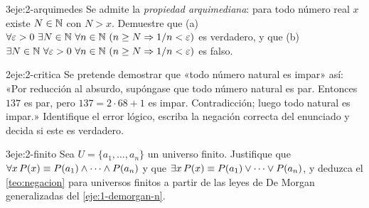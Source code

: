 \begin{ejercicio}{3}{eje:2-arquimedes}
Se admite la \emph{propiedad arquimediana}: para todo número real $x$ existe $N\in\mathbb{N}$ con $N>x$. Demuestre que (a) $\forall\varepsilon>0\ \exists N\in\N\ \forall n\in\N\ (n\ge N\Rightarrow 1/n<\varepsilon)$ es verdadero, y que (b) $\exists N\in\mathbb{N}\ \forall\varepsilon>0\ \forall n\in\mathbb{N}\ (n\ge N\Rightarrow 1/n<\varepsilon)$ es falso.
\end{ejercicio}

\begin{ejercicio}{2}{eje:2-critica}
Se pretende demostrar que «todo número natural es impar» así: «Por reducción al absurdo, supóngase que todo número natural es par. Entonces $137$ es par, pero $137=2\cdot 68+1$ es impar. Contradicción; luego todo natural es impar.» Identifique el error lógico, escriba la negación correcta del enunciado y decida si este es verdadero.
\end{ejercicio}

\begin{ejercicio}{3}{eje:2-finito}
Sea $U=\{a_1,\dots,a_n\}$ un universo finito. Justifique que $\forall x\,P(x)\equiv P(a_1)\wedge\dots\wedge P(a_n)$ y que $\exists x\,P(x)\equiv P(a_1)\vee\dots\vee P(a_n)$, y deduzca el \cref{teo:negacion} para universos finitos a partir de las leyes de De Morgan generalizadas del \cref{eje:1-demorgan-n}.
\end{ejercicio}
